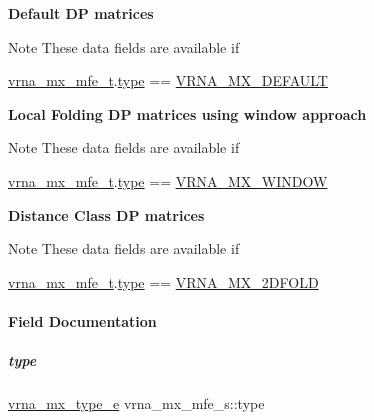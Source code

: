 \begin{Indent}\textbf{ Default DP matrices}\par
{\em \begin{DoxyNote}{Note}
These data fields are available if 
\begin{DoxyCode}
\mbox{\hyperlink{group__dp__matrices_structvrna__mx__mfe__s}{vrna\_mx\_mfe\_t}}.\mbox{\hyperlink{group__dp__matrices_a468680aa937b664d453075108d976ae2}{type}} == \mbox{\hyperlink{group__dp__matrices_gga6042ea1d58d01931e959791be6d89343aafa2568956dab79595521e20c49a5f75}{VRNA\_MX\_DEFAULT}} 
\end{DoxyCode}
 
\end{DoxyNote}
}\end{Indent}
\begin{Indent}\textbf{ Local Folding DP matrices using window approach}\par
{\em \begin{DoxyNote}{Note}
These data fields are available if 
\begin{DoxyCode}
\mbox{\hyperlink{group__dp__matrices_structvrna__mx__mfe__s}{vrna\_mx\_mfe\_t}}.\mbox{\hyperlink{group__dp__matrices_a468680aa937b664d453075108d976ae2}{type}} == \mbox{\hyperlink{group__dp__matrices_gga6042ea1d58d01931e959791be6d89343a2ea5d5947f6ec02544934b0ff2785e99}{VRNA\_MX\_WINDOW}} 
\end{DoxyCode}
 
\end{DoxyNote}
}\end{Indent}
\begin{Indent}\textbf{ Distance Class DP matrices}\par
{\em \begin{DoxyNote}{Note}
These data fields are available if 
\begin{DoxyCode}
\mbox{\hyperlink{group__dp__matrices_structvrna__mx__mfe__s}{vrna\_mx\_mfe\_t}}.\mbox{\hyperlink{group__dp__matrices_a468680aa937b664d453075108d976ae2}{type}} == \mbox{\hyperlink{group__dp__matrices_gga6042ea1d58d01931e959791be6d89343ae656f8391445ff71bed8a597a0a19417}{VRNA\_MX\_2DFOLD}} 
\end{DoxyCode}
 
\end{DoxyNote}
}\end{Indent}


\paragraph{Field Documentation}
\mbox{\label{group__dp__matrices_a468680aa937b664d453075108d976ae2}} 
\subparagraph{\texorpdfstring{type}{type}}
{\footnotesize\ttfamily \mbox{\hyperlink{group__dp__matrices_ga6042ea1d58d01931e959791be6d89343}{vrna\+\_\+mx\+\_\+type\+\_\+e}} vrna\+\_\+mx\+\_\+mfe\+\_\+s\+::type}

